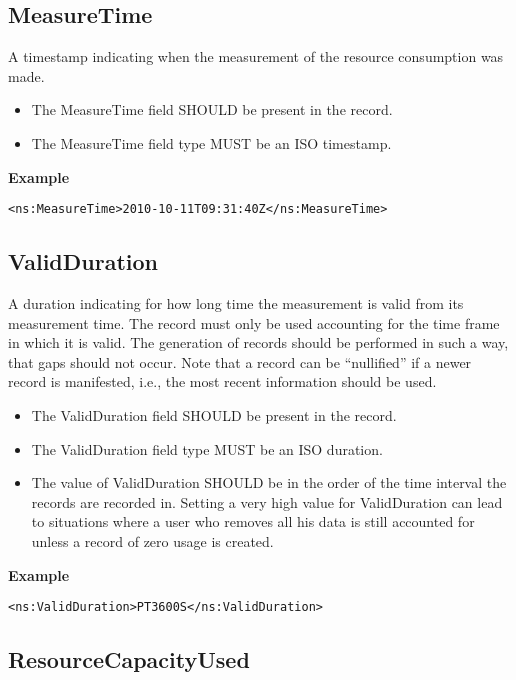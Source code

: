 
\subsection{MeasureTime} \label{MeasureTime}

A timestamp indicating when the measurement of the resource consumption was
made.

\begin{itemize}
\item The MeasureTime field SHOULD be present in the record.
\item The MeasureTime field type MUST be an ISO timestamp.
\end{itemize}

{\bf Example}
\begin{verbatim}
<ns:MeasureTime>2010-10-11T09:31:40Z</ns:MeasureTime>
\end{verbatim}


\subsection{ValidDuration}

A duration indicating for how long time the measurement is valid from its
measurement time. The record must only be used accounting for the time frame in
which it is valid. The generation of records should be performed in such a way,
that gaps should not occur. Note that a record can be ``nullified'' if a newer
record is manifested, i.e., the most recent information should be used.

\begin{itemize}
\item The ValidDuration field SHOULD be present in the record.
\item The ValidDuration field type MUST be an ISO duration.
\item The value of ValidDuration SHOULD be in the order of the time interval the records are recorded in. Setting a very high value for ValidDuration can lead to situations where a user who removes all his data is still accounted for unless a record of zero usage is created.
\end{itemize}

{\bf Example}
\begin{verbatim}
<ns:ValidDuration>PT3600S</ns:ValidDuration>
\end{verbatim}


\subsection{ResourceCapacityUsed} \label{ResourceCapacityUsed}

